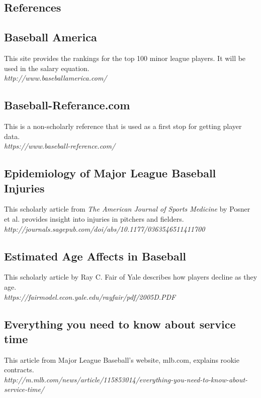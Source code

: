 \documentclass[12pt]{article}
\begin{document}
 \begin{center}\section*{References}\end{center}
\subsection*{Baseball America}
This site provides the rankings for the top 100 minor league players.  It will be used in the salary equation. \\ \textit{http://www.baseballamerica.com/}
\subsection*{Baseball-Referance.com}
This is a non-scholarly reference that is used as a first stop for getting player data.  \\ \textit{https://www.baseball-reference.com/}
\subsection*{Epidemiology of Major League Baseball Injuries}
This scholarly article from \textit{The American Journal of Sports Medicine} by Posner et al. provides insight into injuries in pitchers and fielders. \\ \textit{http://journals.sagepub.com/doi/abs/10.1177/0363546511411700}
\subsection*{Estimated Age Affects in Baseball}
This scholarly article by Ray C. Fair of Yale describes how players decline as they age. \\ \textit{https://fairmodel.econ.yale.edu/rayfair/pdf/2005D.PDF}
\subsection*{Everything you need to know about service time}
This article from Major League Baseball's website, mlb.com, explains rookie contracts. \\ \textit{http://m.mlb.com/news/article/115853014/everything-you-need-to-know-about-service-time/} 
\end{document}
